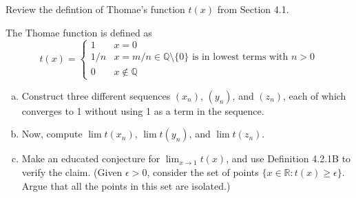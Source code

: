 Review the defintion of Thomae's function $t(x)$ from Section 4.1.

The Thomae function is defined as
$$
t(x) =
\begin{cases} 
    1   & x = 0 \\
    1/n & x=m/n \in \mathbb{Q} \setminus \{0\} \text{ is in lowest terms with } n>0 \\
    0   & x \not\in \mathbb{Q} 
\end{cases}
$$

\begin{enumerate}[(a)]
\item Construct three different sequences $(x_n)$, $(y_n)$, and $(z_n)$, each of which converges to 1 without using 1 as a term in
the sequence.

\item Now, compute $\lim t(x_n)$, $\lim t(y_n)$, and $\lim t(z_n)$.

\item Make an educated conjecture for $\lim_{x\rightarrow 1} t(x)$, and use Definition 4.2.1B to verify the claim.
(Given $\epsilon > 0$, consider the set of points $\{ x\in\mathbb{R} : t(x) \geq \epsilon \}$.
Argue that all the points in this set are isolated.)
\end{enumerate}
